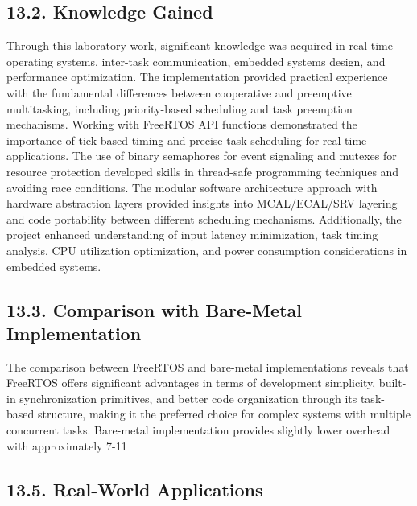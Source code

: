 \documentclass[12pt]{article}
\begin{document}
\subsection*{13.2. Knowledge Gained}

Through this laboratory work, significant knowledge was acquired in real-time operating systems, inter-task communication, embedded systems design, and performance optimization. The implementation provided practical experience with the fundamental differences between cooperative and preemptive multitasking, including priority-based scheduling and task preemption mechanisms. Working with FreeRTOS API functions demonstrated the importance of tick-based timing and precise task scheduling for real-time applications. The use of binary semaphores for event signaling and mutexes for resource protection developed skills in thread-safe programming techniques and avoiding race conditions. The modular software architecture approach with hardware abstraction layers provided insights into MCAL/ECAL/SRV layering and code portability between different scheduling mechanisms. Additionally, the project enhanced understanding of input latency minimization, task timing analysis, CPU utilization optimization, and power consumption considerations in embedded systems.

\subsection*{13.3. Comparison with Bare-Metal Implementation}

The comparison between FreeRTOS and bare-metal implementations reveals that FreeRTOS offers significant advantages in terms of development simplicity, built-in synchronization primitives, and better code organization through its task-based structure, making it the preferred choice for complex systems with multiple concurrent tasks. Bare-metal implementation provides slightly lower overhead with approximately 7-11%

\subsection*{13.5. Real-World Applications}
\end{document}
